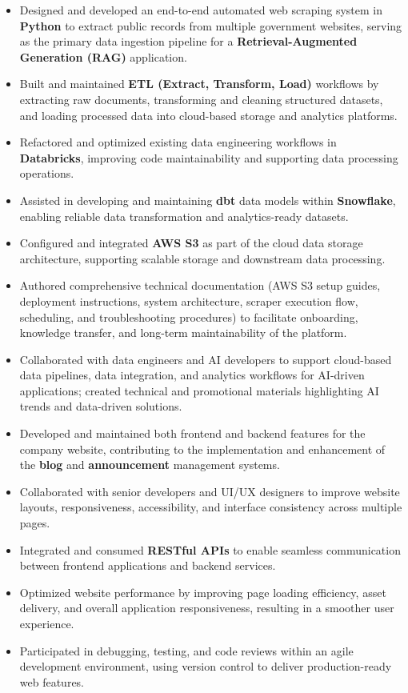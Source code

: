 \documentclass[10pt,a4paper]{article}
\begin{document}
\begin{itemize}
    \item Designed and developed an end-to-end automated web scraping system in \textbf{Python} to extract public records from multiple government websites, serving as the primary data ingestion pipeline for a \textbf{Retrieval-Augmented Generation (RAG)} application.
    \item Built and maintained \textbf{ETL (Extract, Transform, Load)} workflows by extracting raw documents, transforming and cleaning structured datasets, and loading processed data into cloud-based storage and analytics platforms.
    \item Refactored and optimized existing data engineering workflows in \textbf{Databricks}, improving code maintainability and supporting data processing operations.
    \item Assisted in developing and maintaining \textbf{dbt} data models within \textbf{Snowflake}, enabling reliable data transformation and analytics-ready datasets.
    \item Configured and integrated \textbf{AWS S3} as part of the cloud data storage architecture, supporting scalable storage and downstream data processing.
    \item Authored comprehensive technical documentation (AWS S3 setup guides, deployment instructions, system architecture, scraper execution flow, scheduling, and troubleshooting procedures) to facilitate onboarding, knowledge transfer, and long-term maintainability of the platform.
    \item Collaborated with data engineers and AI developers to support cloud-based data pipelines, data integration, and analytics workflows for AI-driven applications; created technical and promotional materials highlighting AI trends and data-driven solutions.
\end{itemize}

\begin{itemize}
    \item Developed and maintained both frontend and backend features for the company website, contributing to the implementation and enhancement of the \textbf{blog} and \textbf{announcement} management systems.
    \item Collaborated with senior developers and UI/UX designers to improve website layouts, responsiveness, accessibility, and interface consistency across multiple pages.
    \item Integrated and consumed \textbf{RESTful APIs} to enable seamless communication between frontend applications and backend services.
    \item Optimized website performance by improving page loading efficiency, asset delivery, and overall application responsiveness, resulting in a smoother user experience.
    \item Participated in debugging, testing, and code reviews within an agile development environment, using version control to deliver production-ready web features.
\end{itemize}
\end{document}
